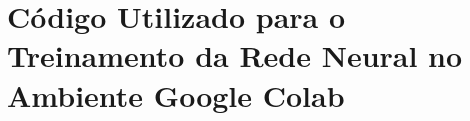 \chapter{Código Utilizado para o Treinamento da Rede Neural no Ambiente Google Colab} \label{apendice:treinamento}


%
